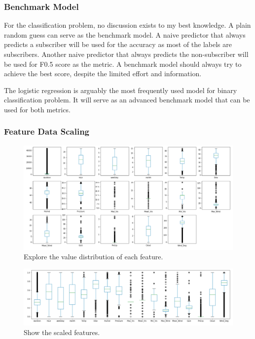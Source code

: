 \documentclass[a4paper]{article}
\begin{document}
			\subsubsection{Benchmark Model}
			
			For the classification problem, no discussion exists to my best knowledge. A plain random guess can serve as the benchmark model. A naive predictor that always predicts a subscriber will be used for the accuracy as most of the labels are subscribers. Another naive predictor that always predicts the non-subscriber will be used for F0.5 score as the metric. A benchmark model should always try to achieve the best score, despite the limited effort and information.
			
			The logistic regression is arguably the most frequently used model for binary classification problem. It will serve as an advanced benchmark model that can be used for both metrics. 
			
			\subsubsection{Feature Data Scaling}
			
			\begin{figure}
				\centering
				\includegraphics[width=1\textwidth]{FeatureScaleCls.png}				\caption{\label{fig:feature_scale}Explore the value distribution of each feature.}	
			\end{figure}	
			
			\begin{figure}
				\centering
				\includegraphics[width=1\textwidth]{FeatureScaled.png}				\caption{\label{fig:feature_scaled}Show the scaled features.}	
			\end{figure}	
			
\end{document}
